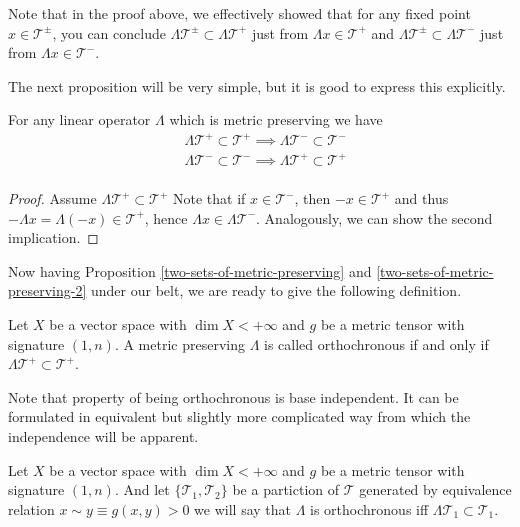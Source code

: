 \documentclass[main.tex]{subfiles}
\begin{document}
Note that in the proof above, we effectively showed that for any fixed point $x\in  \mathcal{T}^{\pm}$, you can conclude $\Lambda \mathcal{T}^{\pm} \subset \Lambda\mathcal{T}^{+}$ just from $\Lambda x\in  \mathcal{T}^{+}$ and $\Lambda \mathcal{T}^{\pm} \subset \Lambda\mathcal{T}^{-}$ just from $\Lambda x\in  \mathcal{T}^{-}$.

The next proposition will be very simple, but it is good to express this explicitly.

\begin{proposition}
\label{two-sets-of-metric-preserving-2}
For any linear operator $\Lambda$ which is metric preserving we have
\begin{align}
& \Lambda\mathcal{T}^{+} \subset \mathcal{T}^{+} \implies \Lambda\mathcal{T}^{-} \subset \mathcal{T}^{-} \\
& \Lambda\mathcal{T}^{-} \subset \mathcal{T}^{-} \implies \Lambda\mathcal{T}^{+} \subset \mathcal{T}^{+} \\
\end{align}
\end{proposition}
\begin{proof}
Assume $\Lambda\mathcal{T}^{+} \subset \mathcal{T}^{+}$ 
Note that if $x\in \mathcal{T}^{-}$, then $-x\in \mathcal{T}^{+}$ and thus $-\Lambda x = \Lambda(-x)\in \mathcal{T}^{+}$, hence $\Lambda x\in \Lambda\mathcal{T}^{-}$. Analogously, we can show the second implication.
\end{proof}

Now having Proposition \ref{two-sets-of-metric-preserving} and \ref{two-sets-of-metric-preserving-2} under our belt, we are ready to give the following definition.

\begin{definition}
Let $X$ be a vector space with $\dim X < +\infty$ and $g$ be a metric tensor with signature $(1, n)$. A metric preserving $\Lambda$ is called orthochronous if and only if 
$\Lambda\mathcal{T}^{+} \subset \mathcal{T}^{+}$.
\end{definition}

Note that property of being orthochronous is base independent. It can be formulated in equivalent but slightly more complicated way from which the independence will be apparent.

\begin{definition}
Let $X$ be a vector space with $\dim X < +\infty$ and $g$ be a metric tensor with signature $(1, n)$. 
And let $\{\mathcal{T}_1, \mathcal{T}_2\}$ 
be a partiction of $\mathcal{T}$ generated by equivalence relation $x \sim y \equiv g(x, y) > 0$ we will say that $\Lambda$ is orthochronous iff $\Lambda \mathcal{T}_1 \subset \mathcal{T}_1$.
\end{definition}
\end{document}
